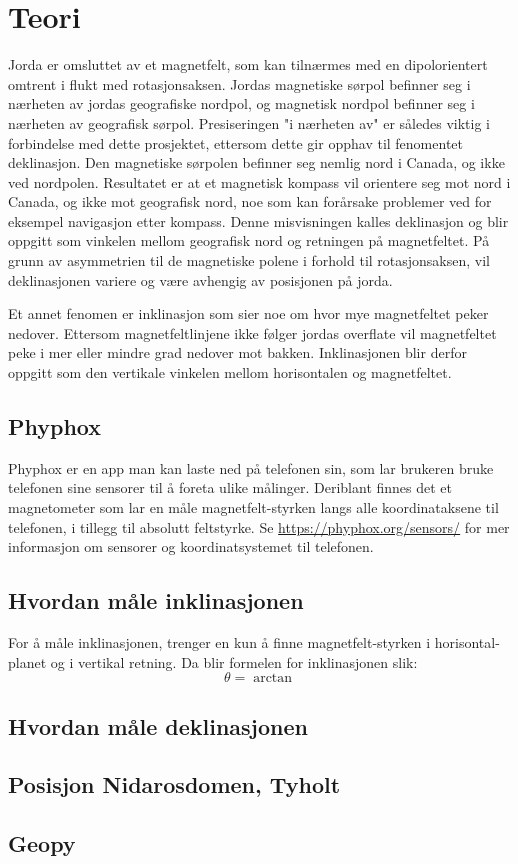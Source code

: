 \section{Teori}
Jorda er omsluttet av et magnetfelt, som kan tilnærmes med en 
dipolorientert omtrent i flukt med rotasjonsaksen. Jordas magnetiske sørpol 
befinner seg i nærheten av jordas geografiske nordpol, og magnetisk nordpol 
befinner seg i nærheten av geografisk sørpol. Presiseringen "i nærheten av" 
er således viktig i forbindelse med dette prosjektet, ettersom dette gir 
opphav til fenomentet deklinasjon. Den magnetiske sørpolen befinner seg 
nemlig nord i Canada, og ikke ved nordpolen. Resultatet er at et magnetisk 
kompass vil orientere seg mot nord i Canada, og ikke mot geografisk nord, 
noe som kan forårsake problemer ved for eksempel navigasjon etter kompass. 
Denne misvisningen kalles deklinasjon og blir oppgitt som vinkelen mellom 
geografisk nord og retningen på magnetfeltet. På grunn av asymmetrien til 
de magnetiske polene i forhold til rotasjonsaksen, vil deklinasjonen 
variere og være avhengig av posisjonen på jorda.

Et annet fenomen er inklinasjon som sier noe om hvor mye magnetfeltet peker 
nedover. Ettersom magnetfeltlinjene ikke følger jordas overflate vil 
magnetfeltet peke i mer eller mindre grad nedover mot bakken. Inklinasjonen 
blir derfor oppgitt som den vertikale vinkelen mellom horisontalen og
magnetfeltet.

\subsection{Phyphox}
Phyphox er en app man kan laste ned på telefonen sin, som lar brukeren 
bruke telefonen sine sensorer til å foreta ulike målinger. Deriblant finnes 
det et magnetometer som lar en måle magnetfelt-styrken langs alle 
koordinataksene til telefonen, i tillegg til absolutt feltstyrke. Se 
\hyperlink{https://phyphox.org/sensors/}{https://phyphox.org/sensors/}
for mer informasjon om sensorer og koordinatsystemet til telefonen.

\subsection{Hvordan måle inklinasjonen}
For å måle inklinasjonen, trenger en kun å finne magnetfelt-styrken i horisontal-
planet og i vertikal retning. Da blir formelen for inklinasjonen slik:
\begin{equation}
    \theta = \arctan
\end{equation}

\subsection{Hvordan måle deklinasjonen}

\subsection{Posisjon Nidarosdomen, Tyholt}

\subsection{Geopy}
